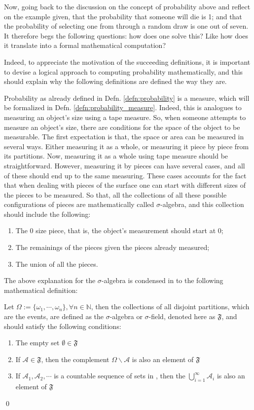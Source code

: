 Now, going back to the discussion on the concept of probability above and reflect on the example given, that the probability that someone will die is 1; and that the probability of selecting one   from   through a random draw is one out of seven. It therefore begs the following questions: how does one solve this? Like how does it translate into a formal mathematical computation?

Indeed, to appreciate the motivation of the succeeding definitions, it is important to devise a logical approach to computing probability mathematically, and this should explain why the following definitions are defined the way they are.

Probability as already defined in Defn. \ref{defn:probability} is a measure, which will be formalized in Defn. \ref{defn:probability_measure}. Indeed, this is analogues to measuring an object's size using a tape measure. So, when someone attempts to measure an object's size, there are conditions for the space of the object to be measurable. The first expectation is that, the space or area can be measured in several ways. Either measuring it as a whole, or measuring it piece by piece from its partitions. Now, measuring it as a whole using tape measure should be straightforward. However, measuring it by pieces can have several cases, and all of these should end up to the same measuring. These cases accounts for the fact that when dealing with pieces of the surface one can start with different sizes of the pieces to be measured. So that, all the collections of all these possible configurations of pieces are mathematically called $\sigma$-algebra, and this collection should include the following:
\begin{enumerate}
    \item The 0 size piece, that is, the object's measurement should start at 0;
    \item The remainings of the pieces given the pieces already measured;
    \item The union of all the pieces.
\end{enumerate}
The above explanation for the $\sigma$-algebra is condensed in to the following mathematical definition:
\begin{defnx}\label{defn:sigma_algebra}
Let $\Omega:=\{\omega_1,\cdots,\omega_n\}, \forall n\in\mathbb{N}$, then the collections of all disjoint partitions, which are the events, are defined as the $\sigma$-algebra or $\sigma$-field, denoted here as $\mathfrak{F}$, and should satisfy the following conditions:
\begin{enumerate}
    \item The empty set $\emptyset\in\mathfrak{F}$
    \item If $\mathscr{A}\in\mathfrak{F}$, then the complement $\Omega\backslash\mathscr{A}$ is also an element of $\mathfrak{F}$
    \item If $\mathscr{A}_1,\mathscr{A}_2,\cdots$ is a countable sequence of sets in , then the $\bigcup_{i=1}^{\infty}\mathscr{A}_i$ is also an element of $\mathfrak{F}$
\end{enumerate}\qed
\end{defnx}
